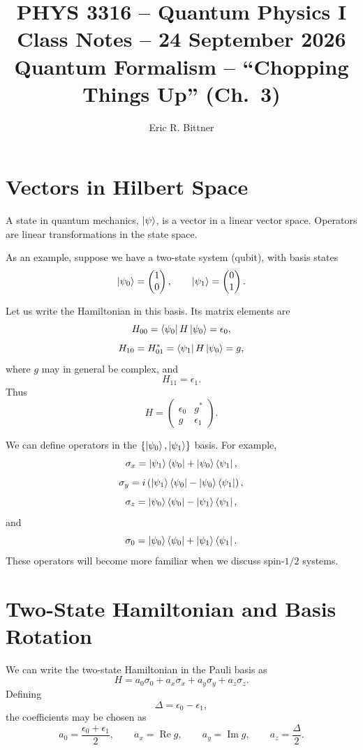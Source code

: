 \documentclass[11pt]{article}
\title{\textbf{PHYS 3316 -- Quantum Physics I}\\
Class Notes -- 24 September 2026\\[0.4em]
\large Quantum Formalism -- ``Chopping Things Up'' (Ch.~3)}
\author{Eric R. Bittner}
\date{}
\begin{document}
\maketitle

\section{Vectors in Hilbert Space}

A state in quantum mechanics, $\ket{\psi}$, is a vector in a linear vector
space. Operators are linear transformations in the state space.

As an example, suppose we have a two-state system (qubit), with basis states
\[
\ket{\psi_0}
=
\begin{pmatrix}
1\\
0
\end{pmatrix},
\qquad
\ket{\psi_1}
=
\begin{pmatrix}
0\\
1
\end{pmatrix}.
\]

Let us write the Hamiltonian in this basis. Its matrix elements are
\[
H_{00}=\bra{\psi_0}H\ket{\psi_0}=\epsilon_0,
\]
\[
H_{10}=H_{01}^*
=
\bra{\psi_1}H\ket{\psi_0}
=
g,
\]
where $g$ may in general be complex, and
\[
H_{11}=\epsilon_1.
\]
Thus
\[
H=
\begin{pmatrix}
\epsilon_0 & g^*\\
g & \epsilon_1
\end{pmatrix}.
\]

We can define operators in the $\{\ket{\psi_0},\ket{\psi_1}\}$ basis. For
example,
\[
\sigma_x
=
\ket{\psi_1}\bra{\psi_0}
+
\ket{\psi_0}\bra{\psi_1},
\]
\[
\sigma_y
=
i\left(
\ket{\psi_1}\bra{\psi_0}
-
\ket{\psi_0}\bra{\psi_1}
\right),
\]
\[
\sigma_z
=
\ket{\psi_0}\bra{\psi_0}
-
\ket{\psi_1}\bra{\psi_1},
\]
and
\[
\sigma_0
=
\ket{\psi_0}\bra{\psi_0}
+
\ket{\psi_1}\bra{\psi_1}.
\]
These operators will become more familiar when we discuss spin-$1/2$ systems.

\section{Two-State Hamiltonian and Basis Rotation}

We can write the two-state Hamiltonian in the Pauli basis as
\[
H
=
a_0\sigma_0
+
a_x\sigma_x
+
a_y\sigma_y
+
a_z\sigma_z.
\]
Defining
\[
\Delta=\epsilon_0-\epsilon_1,
\]
the coefficients may be chosen as
\[
a_0=\frac{\epsilon_0+\epsilon_1}{2},
\qquad
a_x=\operatorname{Re}g,
\qquad
a_y=\operatorname{Im}g,
\qquad
a_z=\frac{\Delta}{2}.
\]
\end{document}
